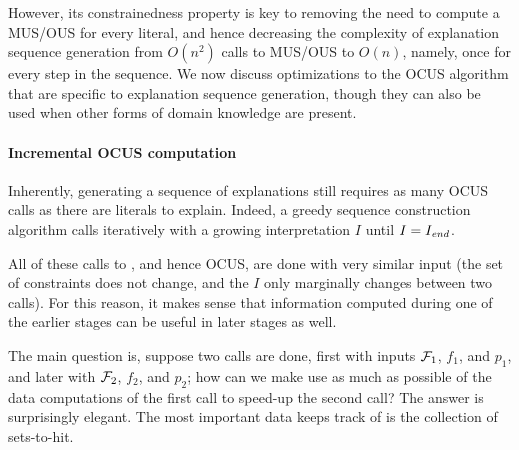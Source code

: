 However, its constrainedness property is key to removing the need to compute a MUS/OUS for every literal, and hence decreasing the complexity of explanation sequence generation from $O(n^2)$ calls to MUS/OUS to $O(n)$, namely, once for every step in the sequence.
 We now discuss optimizations to the OCUS algorithm that are specific to explanation sequence generation, though they can also be used when other forms of domain knowledge are present. 
 
\paragraph{Incremental OCUS computation}
Inherently, generating a sequence of explanations still requires as many OCUS calls as there are literals to explain. 
Indeed, a greedy sequence construction algorithm %
calls \onestepo iteratively with a growing interpretation $I$ until $I=I_\mathit{end} $.

All of these calls to \onestepo, and hence OCUS, are done with very similar input (the set of constraints does not change, and the $I$ only marginally changes between two calls). For this reason, it makes sense that information computed during one of the earlier stages can be useful in later stages as well. 

The main question is, suppose two \comus calls are done, first with inputs $\mathcal{F} _1$, $f_1$, and $p_1$, and later with $\mathcal{F} _2$, $f_2$, and $p_2$; how can we make use as much as possible of the data computations of the first call to speed-up the second call? The answer is surprisingly elegant. The most important data \comus keeps track of  is the collection \setstohit of sets-to-hit.

